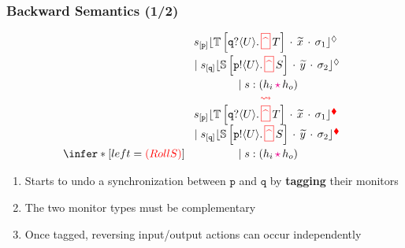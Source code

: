 \documentclass[12pt]{beamer}
\newcommand{\myctxr}[2]{{#1\left[\textcolor{black}{#2}\right]}}
\newcommand{\bkcolor}[1]{\textcolor{red}{#1}}
\newcommand{\sepcolor}[1]{\textcolor{magenta}{#1}}
\newcommand{\sred}[1]{\textcolor{myred}{#1}}
\newcommand{\bi}{\begin{enumerate}[$\bullet$]}
\newcommand{\ei}{\end{enumerate}}
\newcommand{\queue}[1]{\lfloor #1 \rfloor}
\newcommand{\store}{\sigma}
\newcommand{\ctx}[1]{\mathbb{#1}}
\newcommand{\mysepp}{\,\cdot\,}
\newcommand{\mytilde}[1]{\widetilde{#1}}
\newcommand{\codah}[4]{\coda{#1}{(#2\,\history\,#3)\!#4}}
\newcommand{\history}{\sepcolor{\mathbf{\star}}}
\newcommand{\coda}[2]{#1:#2}
\newcommand{\gpart}[1]{\mathtt{#1}}
\newcommand{\hmoni}[4]{\ensuremath{{#1\queue{\textcolor{black}{#2}\mysepp #3\mysepp #4}^{\normark}}}}
\newcommand{\monir}[4]{\ensuremath{{#1\queue{\textcolor{black}{#2}\mysepp #3\mysepp #4}^{\bkcolor{\rmark}}}}}
\newcommand{\past}{\,\text{\textcolor{red}{\textbf{\textasciicircum}}}\,}
\newcommand{\mypast}{\,\sred{\framebox[3mm]{\past}\,}}
\newcommand{\Par}{\;|\;}
\newcommand{\bk}{\ensuremath{\bkcolor{\,\rightsquigarrow\,}}}
\newcommand{\p}{\ensuremath{\mathtt{p}}\xspace}
\newcommand{\q}{\ensuremath{\mathtt{q}}\xspace}
\newcommand{\ltinpp}[3]{\gpart{#1}?\langle#2\rangle.\mypast #3}
\newcommand{\ep}[2]{#1_{[#2]}}
\newcommand{\ltoutp}[3]{\gpart{#1}!\langle#2\rangle.\mypast #3}
\newcommand{\rmark}{\bkcolor{\blacklozenge}}
\newcommand{\normark}{\lozenge}
\begin{document}
\begin{frame}
	\frametitle{Backward Semantics (1/2)}
	\vspace{-5mm}
$$
	\infer*[left=\bkcolor{(RollS)}]{ }{
	{\begin{tabular}[b]{c}
$\hmoni{\ep{s}{\p}}{ \myctxr{\ctx T}{\ltinpp{\q}{U}{T}}}{\mytilde x}{\store_1} $ 
\\[2mm]
$\Par \hmoni{\ep{s}{\q}}{ \myctxr{\ctx S}{\ltoutp{\p}{U}{S}}}{\mytilde y}{\store_2}$ 
\\[2mm]
$\Par \codah{s}{h_i}{h_o}{}$
\\
\bk 
\\
$\monir{\ep{s}{\p}}{ \myctxr{\ctx T}{\ltinpp{\q}{U}{T}}}{\mytilde x}{\store_1}$ 
\\
$\Par \monir{\ep{s}{\q}}{\myctxr{\ctx S}{\ltoutp{\p}{U}{S}}}{\mytilde y}{\store_2}$
\\[2mm]
$\Par\codah{s}{h_i}{h_o}{}$
\end{tabular}}
}
$$
	\vspace{-5mm}
	\bi
\item Starts to undo a synchronization between $\p$ and $\q$ by \textbf{tagging} their monitors 
\item The two monitor types must be complementary
\item Once tagged, reversing input/output actions can occur independently
	\ei 
\end{frame}

\end{document}
